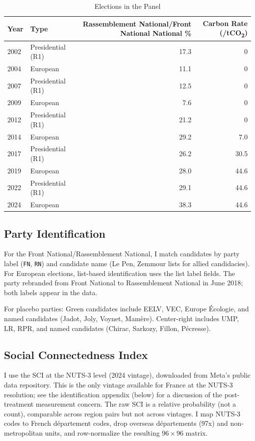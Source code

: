 \documentclass[12pt]{article}
\providecommand{\euro}{\texteuro}
\newcommand{\rn}{Rassemblement National}
\newcommand{\fn}{Front National}
\newcommand{\dept}{d\'{e}partement}
\newcommand{\depts}{d\'{e}partements}
\begin{document}
\begin{table}[H]
\centering
\caption{Elections in the Panel}
\label{tab:elections}
\begin{tabular}{@{}llrr@{}}
\toprule
Year & Type & \rn{}/\fn{} National \% & Carbon Rate (\euro/tCO\textsubscript{2}) \\
\midrule
2002 & Presidential (R1) & 17.3 & 0 \\
2004 & European & 11.1 & 0 \\
2007 & Presidential (R1) & 12.5 & 0 \\
2009 & European & 7.6 & 0 \\
2012 & Presidential (R1) & 21.2 & 0 \\
2014 & European & 29.2 & 7.0 \\
2017 & Presidential (R1) & 26.2 & 30.5 \\
2019 & European & 28.0 & 44.6 \\
2022 & Presidential (R1) & 29.1 & 44.6 \\
2024 & European & 38.3 & 44.6 \\
\bottomrule
\end{tabular}
\end{table}

\subsection{Party Identification}

For the \fn{}/\rn{}, I match candidates by party label (\texttt{FN}, \texttt{RN}) and candidate name (Le Pen, Zemmour lists for allied candidacies). For European elections, list-based identification uses the list label fields. The party rebranded from \fn{} to \rn{} in June 2018; both labels appear in the data.

For placebo parties: Green candidates include EELV, VEC, Europe \'{E}cologie, and named candidates (Jadot, Joly, Voynet, Mam\`{e}re). Center-right includes UMP, LR, RPR, and named candidates (Chirac, Sarkozy, Fillon, P\'{e}cresse).

\subsection{Social Connectedness Index}

I use the SCI at the NUTS-3 level (2024 vintage), downloaded from Meta's public data repository. This is the only vintage available for France at the NUTS-3 resolution; see the identification appendix (below) for a discussion of the post-treatment measurement concern. The raw SCI is a relative probability (not a count), comparable across region pairs but not across vintages. I map NUTS-3 codes to French \dept{} codes, drop overseas \depts{} (97x) and non-metropolitan units, and row-normalize the resulting $96 \times 96$ matrix.
\end{document}
